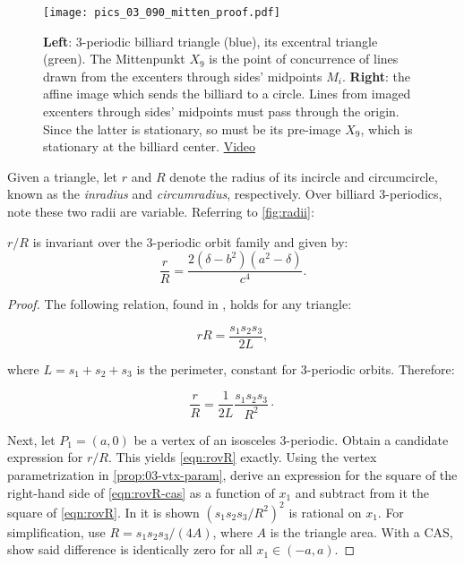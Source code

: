\begin{figure}
     \centering
    \texttt{[image: pics\_03\_090\_mitten\_proof.pdf]}
     \caption{\textbf{Left}: 3-periodic billiard triangle (blue), its excentral triangle (green). The Mittenpunkt $X_9$ is the point of concurrence of lines drawn from the excenters through sides' midpoints $M_i$. \textbf{Right}: the affine image which sends the billiard to a circle. Lines from imaged excenters through sides' midpoints must pass through the origin. Since the latter is stationary, so must be its pre-image $X_9$, which is stationary at the billiard center.  %
     \href{https://youtu.be/tMrBqfRBYik}{Video}}
     \label{fig:03-x9} 
\end{figure}

Given a triangle, let $r$ and $R$ denote the radius of its incircle and circumcircle, known as the {\em inradius} and {\em circumradius}, respectively. Over billiard 3-periodics, note these two radii are variable. Referring to \cref{fig:radii}:

\begin{theorem}
$r/R$ is invariant over the 3-periodic orbit family and given by:
\begin{equation*}
\label{eqn:rovR}
\frac{r}{R}=\frac{2 (\delta-b^2)(a^2-\delta)}{c^4}.
\end{equation*}
\label{thm:03-confocal-rovR}
\end{theorem}

\begin{proof}
The following relation, found in \cite{johnson1960}, holds for any triangle:

\begin{equation*}
 r R=\frac{s_1s_2s_3}{2 L}, 
\end{equation*}

\noindent where $L=s_1+s_2+s_3$ is the perimeter, constant for 3-periodic orbits. Therefore:

\begin{equation}
\frac{r}{R}=\frac{1}{2L} \frac{s_1s_2s_3}{R^2}\cdot
\label{eqn:rovR-cas}
\end{equation}

Next, let $P_1=(a,0)$ be a vertex of an isosceles 3-periodic. Obtain a candidate expression for $r/R$. This yields \eqref{eqn:rovR} exactly. Using the vertex parametrization in \cref{prop:03-vtx-param}, derive an expression for the square of the right-hand side of \eqref{eqn:rovR-cas} as a function of $x_1$ and subtract from it the square of \eqref{eqn:rovR}. In  \cite{garcia2020-new-properties}
it is shown $\left(s_1s_2s_3/R^2\right)^2$ is rational on $x_1$. For simplification, use $R=s_1 s_2 s_3/(4A)$, where $A$ is the triangle area. With a CAS, show said difference is identically zero for all $x_1\in(-a,a)$.
\end{proof}


